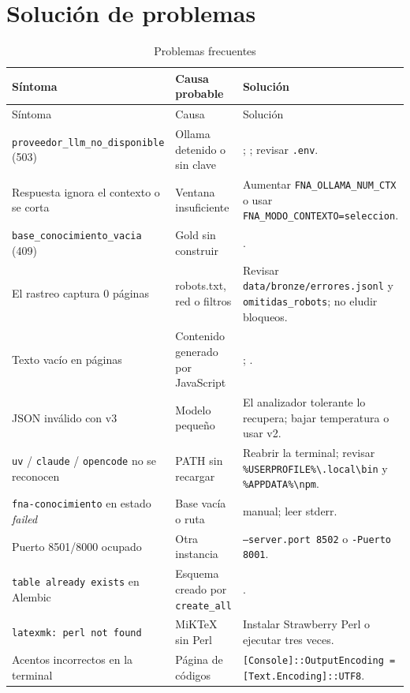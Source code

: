 \chapter{Solución de problemas}\label{cap:problemas}
\begin{longtable}{@{}P{5.0cm}P{4.0cm}P{6.0cm}@{}}
\caption{Problemas frecuentes}\label{tab:problemas}\\\toprule
Síntoma & Causa probable & Solución\\\midrule\endfirsthead
\toprule Síntoma & Causa & Solución\\\midrule\endhead
\texttt{proveedor\_llm\_no\_disponible} (503) & Ollama detenido o sin clave & ; ; revisar \texttt{.env}.\\
Respuesta ignora el contexto o se corta & Ventana insuficiente & Aumentar \texttt{FNA\_OLLAMA\_NUM\_CTX} o usar \texttt{FNA\_MODO\_CONTEXTO=seleccion}.\\
\texttt{base\_conocimiento\_vacia} (409) & Gold sin construir & .\\
El rastreo captura 0 páginas & robots.txt, red o filtros & Revisar \texttt{data/bronze/errores.jsonl} y \texttt{omitidas\_robots}; no eludir bloqueos.\\
Texto vacío en páginas & Contenido generado por JavaScript & ; .\\
JSON inválido con v3 & Modelo pequeño & El analizador tolerante lo recupera; bajar temperatura o usar v2.\\
\texttt{uv} / \texttt{claude} / \texttt{opencode} no se reconocen & PATH sin recargar & Reabrir la terminal; revisar \texttt{\%USERPROFILE\%\textbackslash .local\textbackslash bin} y \texttt{\%APPDATA\%\textbackslash npm}.\\
\texttt{fna-conocimiento} en estado \emph{failed} & Base vacía o ruta &  manual; leer stderr.\\
Puerto 8501/8000 ocupado & Otra instancia & \texttt{--server.port 8502} o \texttt{-Puerto 8001}.\\
\texttt{table already exists} en Alembic & Esquema creado por \texttt{create\_all} & .\\
\texttt{latexmk: perl not found} & MiKTeX sin Perl & Instalar Strawberry Perl o ejecutar  tres veces.\\
Acentos incorrectos en la terminal & Página de códigos & \texttt{[Console]::OutputEncoding = [Text.Encoding]::UTF8}.\\\bottomrule
\end{longtable}
